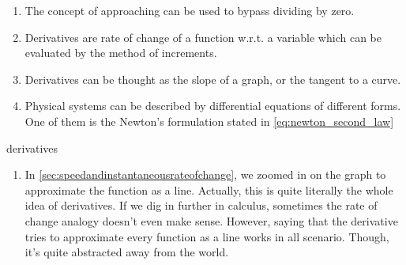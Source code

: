 \conclusion

\begin{enumerate}[noitemsep]
    \item The concept of approaching can be used to bypass dividing by zero.
    \item Derivatives are rate of change of a function w.r.t. a variable which can be evaluated by the method of increments.
    \item Derivatives can be thought as the slope of a graph, or the tangent to a curve.
    \item Physical systems can be described by differential equations of different forms. One of them is the Newton's formulation stated in \cref{eq:newton_second_law}
\end{enumerate}

\begin{remark}{}{derivatives}
    \begin{enumerate}
        \item In \cref{sec:speedandinstantaneousrateofchange}, we zoomed in on the graph to approximate the function as a line. Actually, this is quite literally the whole idea of derivatives. If we dig in further in calculus, sometimes the rate of change analogy doesn't even make sense. However, saying that the derivative tries to approximate every function as a line works in all scenario. Though, it's quite abstracted away from the world.
    \end{enumerate}
\end{remark}
